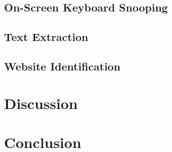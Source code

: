 \documentclass[11pt]{report} %
\begin{document}
\begin{mainf}
        \section{On-Screen Keyboard Snooping}
        \section{Text Extraction}
        \section{Website Identification}
    \chapter{Discussion}
    \chapter{Conclusion}
    \end{mainf}
    
    \appendix
    
    \newenvironment{appendixf}{}{}
    \titlespacing*{\chapter}{0pt}{-33 pt}{6 pt} %
    \begin{appendixf}
    
    \clearpage
    \chapter{}
    
    
    \end{appendixf}
    
\end{document}
